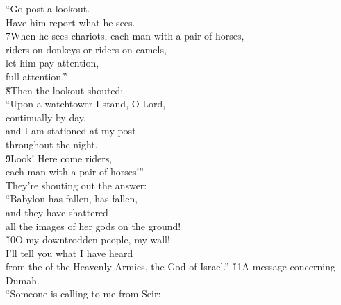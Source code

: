 \begin{poetry}
\poeml ``Go post a lookout. \\
\poemlll       Have him report what he sees. \\
\poeml \v{7}When he sees chariots, each man with a pair of horses, \\
\poemll    riders on donkeys or riders on camels, \\
\poeml let him pay attention, \\
\poemll    full attention.'' \\
\poeml \v{8}Then the lookout shouted: \\
\poemll    ``Upon a watchtower I stand, O Lord, \\
\poemlll       continually by day, \\
\poeml and I am stationed at my post \\
\poemll    throughout the night. \\
\poeml \v{9}Look! Here come riders, \\
\poemll    each man with a pair of horses!'' \\
\poemlll       They're shouting out the answer: \\
\poeml ``Babylon has fallen, has fallen, \\
\poemll    and they have shattered \\
\poemlll       all the images of her gods on the ground! \\
\poeml \v{10}O my downtrodden people, my wall! \\
\poemll    I'll tell you what I have heard \\
\poemlll       from the  of the Heavenly Armies, the God of Israel.''
\poeml \v{11}A message concerning Dumah. \\
\poeml ``Someone is calling to me from Seir: \\

\end{poetry}
